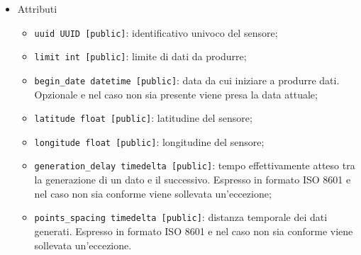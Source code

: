 \begin{itemize}
	      \begin{itemize}
		      \item Attributi
		            \begin{itemize}
			            \item \texttt{uuid UUID [public]}: identificativo univoco del sensore;
			            \item \texttt{limit int [public]}: limite di dati da produrre;
			            \item \texttt{begin\_date datetime [public]}: data da cui iniziare a produrre dati. Opzionale e nel caso non sia presente viene presa la data attuale;
			            \item \texttt{latitude float [public]}: latitudine del sensore;
			            \item \texttt{longitude float [public]}: longitudine del sensore;
			            \item \texttt{generation\_delay timedelta [public]}: tempo effettivamente atteso tra la generazione di un dato e il successivo. Espresso in formato ISO 8601 e nel caso non sia conforme viene sollevata un'eccezione;
			            \item \texttt{points\_spacing timedelta [public]}: distanza temporale dei dati generati. Espresso in formato ISO 8601 e nel caso non sia conforme viene sollevata un'eccezione.
		            \end{itemize}
	      \end{itemize}
\end{itemize}
